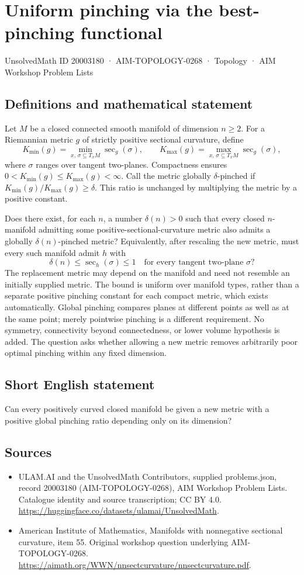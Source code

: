 \documentclass[11pt,a4paper]{article}
\begin{document}
\section*{Uniform pinching via the best-pinching functional}\label{20003180}
{\small UnsolvedMath ID 20003180 · AIM-TOPOLOGY-0268 · Topology · AIM Workshop Problem Lists}
\subsection{Definitions and mathematical statement}
Let $M$ be a closed connected smooth manifold of dimension $n\geq2$.
For a Riemannian metric $g$ of strictly positive sectional curvature, define
\[
 K_{\min}(g)=\min_{x,\,\sigma\subseteq T_xM}\sec_g(\sigma),
 \qquad
 K_{\max}(g)=\max_{x,\,\sigma\subseteq T_xM}\sec_g(\sigma),
\]
where $\sigma$ ranges over tangent two-planes.
Compactness ensures $0<K_{\min}(g)\leq K_{\max}(g)<\infty$.
Call the metric globally $\delta$-pinched if
$K_{\min}(g)/K_{\max}(g)\geq\delta$.
This ratio is unchanged by multiplying the metric by a positive constant.

Does there exist, for each $n$, a number $\delta(n)>0$ such that every closed $n$-manifold admitting some positive-sectional-curvature metric also admits a globally $\delta(n)$-pinched metric?
Equivalently, after rescaling the new metric, must every such manifold admit $h$ with
\[
 \delta(n)\leq\sec_h(\sigma)\leq1
 \quad\text{for every tangent two-plane }\sigma?
\]
The replacement metric may depend on the manifold and need not resemble an initially supplied metric.
The bound is uniform over manifold types, rather than a separate positive pinching constant for each compact metric, which exists automatically.
Global pinching compares planes at different points as well as at the same point; merely pointwise pinching is a different requirement.
No symmetry, connectivity beyond connectedness, or lower volume hypothesis is added.
The question asks whether allowing a new metric removes arbitrarily poor optimal pinching within any fixed dimension.
\subsection{Short English statement}
Can every positively curved closed manifold be given a new metric with a positive global pinching ratio depending only on its dimension?
\subsection{Sources}
\begin{itemize}
\item[S1] ULAM.AI and the UnsolvedMath Contributors, supplied problems.json, record 20003180 (AIM-TOPOLOGY-0268), AIM Workshop Problem Lists. Catalogue identity and source transcription; CC BY 4.0.
\url{https://huggingface.co/datasets/ulamai/UnsolvedMath}.
\item[S2] American Institute of Mathematics, Manifolds with nonnegative sectional curvature, item 55. Original workshop question underlying AIM-TOPOLOGY-0268.
\url{https://aimath.org/WWN/nnsectcurvature/nnsectcurvature.pdf}.
\end{itemize}
\end{document}
